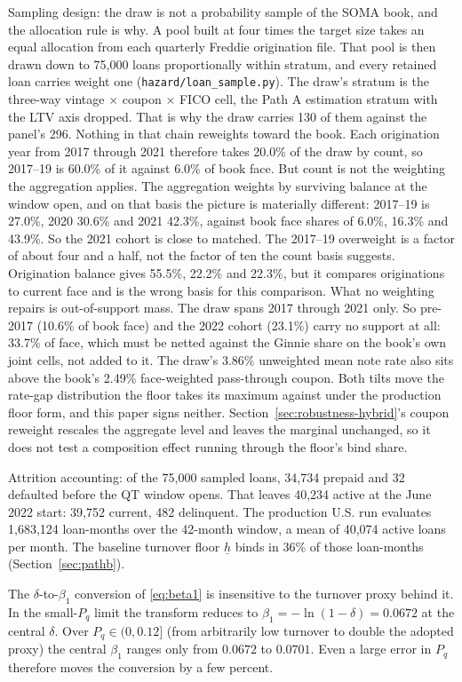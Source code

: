 \documentclass[12pt]{article}
\begin{document}
Sampling design: the draw is not a probability sample of the SOMA book, and the allocation rule is why. A pool built at four times the target size takes an equal allocation from each quarterly Freddie origination file. That pool is then drawn down to 75,000 loans proportionally within stratum, and every retained loan carries weight one (\texttt{hazard/loan\_sample.py}). The draw's stratum is the three-way vintage $\times$ coupon $\times$ FICO cell, the Path A estimation stratum with the LTV axis dropped. That is why the draw carries 130 of them against the panel's 296. Nothing in that chain reweights toward the book. Each origination year from 2017 through 2021 therefore takes 20.0\% of the draw by count, so 2017--19 is 60.0\% of it against 6.0\% of book face. But count is not the weighting the aggregation applies. The aggregation weights by surviving balance at the window open, and on that basis the picture is materially different: 2017--19 is 27.0\%, 2020 30.6\% and 2021 42.3\%, against book face shares of 6.0\%, 16.3\% and 43.9\%. So the 2021 cohort is close to matched. The 2017--19 overweight is a factor of about four and a half, not the factor of ten the count basis suggests. Origination balance gives 55.5\%, 22.2\% and 22.3\%, but it compares originations to current face and is the wrong basis for this comparison. What no weighting repairs is out-of-support mass. The draw spans 2017 through 2021 only. So pre-2017 (10.6\% of book face) and the 2022 cohort (23.1\%) carry no support at all: 33.7\% of face, which must be netted against the Ginnie share on the book's own joint cells, not added to it. The draw's 3.86\% unweighted mean note rate also sits above the book's 2.49\% face-weighted pass-through coupon. Both tilts move the rate-gap distribution the floor takes its maximum against under the production floor form, and this paper signs neither. Section~\ref{sec:robustness-hybrid}'s coupon reweight rescales the aggregate level and leaves the marginal unchanged, so it does not test a composition effect running through the floor's bind share.

Attrition accounting: of the 75,000 sampled loans, 34,734 prepaid and 32 defaulted before the QT window opens. That leaves 40,234 active at the June 2022 start: 39,752 current, 482 delinquent. The production U.S. run evaluates 1,683,124 loan-months over the 42-month window, a mean of 40,074 active loans per month. The baseline turnover floor $\underline{h}$ binds in 36\% of those loan-months (Section~\ref{sec:pathb}).

The $\delta$-to-$\beta_1$ conversion of \eqref{eq:beta1} is insensitive to the turnover proxy behind it. In the small-$P_q$ limit the transform reduces to $\beta_1 = -\ln(1-\delta) = 0.0672$ at the central $\delta$. Over $P_q \in (0, 0.12]$ (from arbitrarily low turnover to double the adopted proxy) the central $\beta_1$ ranges only from $0.0672$ to $0.0701$. Even a large error in $P_q$ therefore moves the conversion by a few percent.
\end{document}
